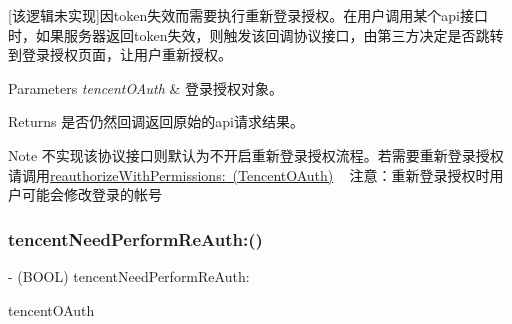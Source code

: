 \mbox{[}该逻辑未实现\mbox{]}因token失效而需要执行重新登录授权。在用户调用某个api接口时，如果服务器返回token失效，则触发该回调协议接口，由第三方决定是否跳转到登录授权页面，让用户重新授权。 
\begin{DoxyParams}{Parameters}
{\em tencent\+O\+Auth} & 登录授权对象。 \\
\hline
\end{DoxyParams}
\begin{DoxyReturn}{Returns}
是否仍然回调返回原始的api请求结果。 
\end{DoxyReturn}
\begin{DoxyNote}{Note}
不实现该协议接口则默认为不开启重新登录授权流程。若需要重新登录授权请调用\mbox{\hyperlink{interface_tencent_o_auth_a0cae2d11a0ac52e1877a05c05100669d}{reauthorize\+With\+Permissions\+: (Tencent\+O\+Auth)}} ~\newline
注意：重新登录授权时用户可能会修改登录的帐号 
\end{DoxyNote}
\mbox{\label{protocol_tencent_session_delegate-p_af961aa9926514b095a51a3dfa8514a38}} 
\subsubsection{\texorpdfstring{tencent\+Need\+Perform\+Re\+Auth\+:()}{tencentNeedPerformReAuth:()}\hspace{0.1cm}{\footnotesize\ttfamily [2/2]}}
{\footnotesize\ttfamily -\/ (B\+O\+OL) tencent\+Need\+Perform\+Re\+Auth\+: \begin{DoxyParamCaption}\item[{(\mbox{\hyperlink{interface_tencent_o_auth}{Tencent\+O\+Auth}} $\ast$)}]{tencent\+O\+Auth }\end{DoxyParamCaption}\hspace{0.3cm}{\ttfamily [optional]}}

